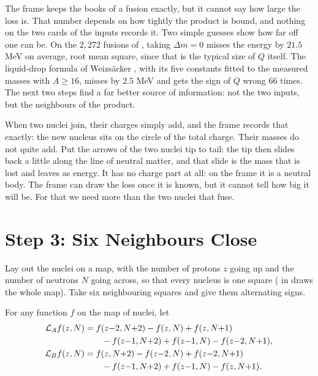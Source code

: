 The frame keeps the books of a fusion exactly, but it cannot say how large the loss is. That number depends on how tightly the product is bound, and nothing on the two cards of the inputs records it. Two simple guesses show how far off one can be. On the $2{,}272$ fusions of , taking $\Delta m = 0$ misses the energy by $21.5$ MeV on average, root mean square, since that is the typical size of $Q$ itself. The liquid-drop formula of Weizs\"acker \citep{Weizsacker1935}, with its five constants fitted to the measured masses with $A \ge 16$, misses by $2.5$ MeV and gets the sign of $Q$ wrong $66$ times. The next two steps find a far better source of information: not the two inputs, but the neighbours of the product.

\begin{plainwords}
When two nuclei join, their charges simply add, and the frame records that exactly: the new nucleus sits on the circle of the total charge. Their masses do not quite add. Put the arrows of the two nuclei tip to tail: the tip then slides back a little along the line of neutral matter, and that slide is the mass that is lost and leaves as energy. It has no charge part at all: on the frame it is a neutral body. The frame can draw the loss once it is known, but it cannot tell how big it will be. For that we need more than the two nuclei that fuse.
\end{plainwords}

\section{Step 3: Six Neighbours Close}\label{sec:cl-loops}

Lay out the nuclei on a map, with the number of protons $z$ going up and the number of neutrons $N$ going across, so that every nucleus is one square ( in  draws the whole map). Take six neighbouring squares and give them alternating signs.

\begin{definition}\label{def:closure-loops}
For any function $f$ on the map of nuclei, let
\begin{align*}
\mathcal{L}_A f(z, N) &= f(z{-}2, N{+}2) - f(z, N) + f(z, N{+}1)\\
&\qquad - f(z{-}1, N{+}2) + f(z{-}1, N) - f(z{-}2, N{+}1),\\
\mathcal{L}_B f(z, N) &= f(z, N{+}2) - f(z{-}2, N) + f(z{-}2, N{+}1)\\
&\qquad - f(z{-}1, N{+}2) + f(z{-}1, N) - f(z, N{+}1).
\end{align*}
\end{definition}

